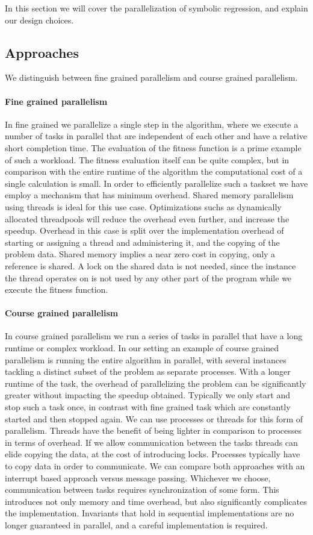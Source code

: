 In this section we will cover the parallelization of symbolic regression, and explain our design choices.
\subsection{Approaches}
We distinguish between fine grained parallelism and course grained parallelism. 
\paragraph{Fine grained parallelism}
In fine grained we parallelize a single step in the algorithm, where we execute a number of tasks in parallel that are independent of each other and have a relative short completion time. The evaluation of the fitness function is a prime example of such a workload. The fitness evaluation itself can be quite complex, but in comparison with the entire runtime of the algorithm the computational cost of a single calculation is small. In order to efficiently parallelize such a taskset we have employ a mechanism that has minimum overhead. Shared memory parallelism using threads is ideal for this use case. Optimizations suchs as dynamically allocated threadpools will reduce the overhead even further, and increase the speedup. Overhead in this case is split over the implementation overhead of starting or assigning a thread and administering it, and the copying of the problem data. Shared memory implies a near zero cost in copying, only a reference is shared. A lock on the shared data is not needed, since the instance the thread operates on is not used by any other part of the program while we execute the fitness function. 
\paragraph{Course grained parallelism}
In course grained parallelism we run a series of tasks in parallel that have a long runtime or complex workload. In our setting an example of course grained parallelism is running the entire algorithm in parallel, with several instances tackling a distinct subset of the problem as separate processes. With a longer runtime of the task, the overhead of parallelizing the problem can be significantly greater without impacting the speedup obtained. Typically we only start and stop such a task once, in contrast with fine grained task which are constantly started and then stopped again. We can use processes or threads for this form of parallelism. Threads have the benefit of being lighter in comparison to processes in terms of overhead. If we allow communication between the tasks threads can elide copying the data, at the cost of introducing locks. Processes typically have to copy data in order to communicate. We can compare both approaches with an interrupt based approach versus message passing. Whichever we choose, communication between tasks requires synchronization of some form. This introduces not only memory and time overhead, but also significantly complicates the implementation. Invariants that hold in sequential implementations are no longer guaranteed in parallel, and a careful implementation is required. 
